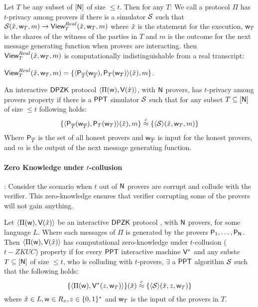 Let $T$ be any subset of $[ \mathsf{N} ]$ of size $\leq t$. Then for any $T$: 
We call a protocol $\Pi$ has $t$-privacy among provers if there is a simulator $\mathcal{S}$ such that $\mathcal{S}(\hat{x}, \mathsf{w}_T, m) \rightarrow \mathsf{View}^{Real}_T(\hat{x}, \mathsf{w}_T, m)$ where $\hat{x}$ is the statement for the execution, $\mathsf{w}_T$ is the shares of the witness of the parties in $T$ and $m$ is the outcome for the next message generating function when provers are interacting. then $\mathsf{View}^{Real}_T(\hat{x}, \mathsf{w}_T, m)$ is computationally indistinguishable from a real transcript: 

$\mathsf{View}^{Real}_T ( \hat{x}, \mathsf{w}_T, m) = \{ \langle  \mathsf{P}_{\overline{T}}( \mathsf{w}_{\overline{T}} ) , \mathsf{P}_T ( \mathsf{w}_T ) \rangle ( \hat{x} ) , m \}$.
\begin{definition}
	An interactive $\mathsf{DPZK}$ protocol $\langle \Pi (\mathsf{w}) ,\mathsf{V} ( \hat{x} )\rangle$, with $\mathsf{N}$ provers,  has $t$-privacy among provers property if there is a $\mathsf{PPT}$ simulator $\mathcal{S}$ such that for any subset $T\subseteq [\mathsf{N}]$ of size $\leq t$ following holds: 
	$$ \{ \langle  \mathsf{P}_{\overline{T}}( \mathsf{w}_{\overline{T}} ) , \mathsf{P}_T ( \mathsf{w}_T ) \rangle ( \hat{x} ) , m \} \stackrel{c}{\approx} \{ \langle \mathcal{S} \rangle (\hat{x}, \mathsf{w}_T, m) \}$$  
	Where $\mathsf{P}_{\overline{T}}$ is the set of all honest provers and $\mathsf{w}_{\overline{T}}$ is input for the honest provers, and $m$ is the output of the next message generating function.
\end{definition}

\paragraph{Zero Knowledge under $t$-collusion}: Consider the scenario when $t$ out of $\mathsf{N}$ provers are corrupt and collude with the verifier. This zero-knowledge ensures that verifier corrupting some of the provers will not gain anything.

\begin{definition}
	Let $\langle  \Pi ( \mathsf{w} ), \mathsf{V}( \hat{x} )\rangle$ be an interactive $\mathsf{DPZK}$ protocol , with $\mathsf{N}$ provers, for some language $L$. Where each messages of $\Pi$ is generated by the provers $\mathsf{P}_1, \ldots, \mathsf{P}_{\mathsf{N}}$. Then $\langle  \Pi ( \mathsf{w} ), \mathsf{V}( \hat{x} )\rangle$ has computational zero-knowledge under $t$-collusion ($t-ZKUC$) property if for every $\mathsf{PPT}$ interactive machine $\mathsf{V}^*$ and any subste $T\subseteq [\mathsf{N}]$ of size $\leq t$, who is colluding with $t$-provers, $\exists$ a $\mathsf{PPT}$ algorithm $\mathcal{S}$ such that the following holds: 
	$$ \{ \langle \Pi(\mathsf{w}),\mathsf{V}^*(z, \mathsf{w}_T)\rangle \}( \hat{x})  \stackrel{c}{\approx} \{ \langle \mathcal{S} \rangle (\hat{x}, z, \mathsf{w}_T) \} $$
	where $\hat{x} \in L, \mathsf{w} \in R_x, z\in \{0,1\}^*$ and $\mathsf{w}_T$ is the input of the provers in $T$. 
\end{definition}

